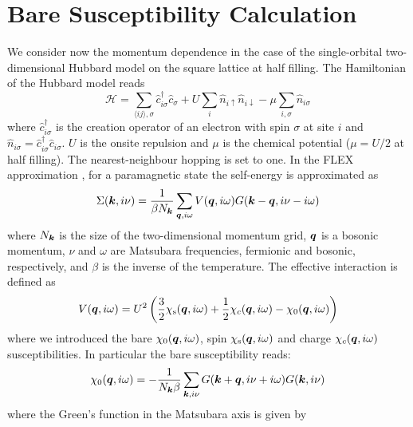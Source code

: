 \section{Bare Susceptibility Calculation}
\label{sec:bubbleCalc}

We consider now the momentum dependence in the case of the single-orbital two-dimensional Hubbard model on the square lattice at half filling. 
The Hamiltonian of the Hubbard model reads
\begin{equation}
    \mathcal{H} = \sum_{\langle ij \rangle, \sigma} \hat{c}^\dag_{i\sigma}\hat{c}_{\sigma} + U \sum_{i} \hat{n}_{i\uparrow}\hat{n}_{i\downarrow} - \mu\sum_{i,\sigma}\hat{n}_{i\sigma}
    \label{eq:HubbardHamiltonian}
\end{equation}
where $\hat{c}^\dag_{i\sigma}$ is the creation operator of an electron with spin $\sigma$ at site $i$ and $\hat{n}_{i\sigma}=\hat{c}^\dag_{i\sigma}\hat{c}_{i\sigma}$. $U$ is the onsite repulsion and $\mu$ is the chemical potential ($\mu=U/2$ at half filling). The nearest-neighbour hopping is set to one.
In the FLEX approximation \cite{Bickers1989}, for a paramagnetic state the self-energy is approximated as
\begin{equation}
    \Sigma(\boldsymbol{k}, i\nu) = \frac{1}{\beta N_{\boldsymbol{k}} } \sum_{\boldsymbol{q},i\omega}V(\boldsymbol{q}, i\omega) G(\boldsymbol{k} - \boldsymbol{q}, i\nu - i\omega)
\end{equation}
where $N_{\boldsymbol{k}}$ is the size of the two-dimensional momentum grid, $\boldsymbol{q}$ is a bosonic momentum, $\nu$ and $\omega$ are Matsubara frequencies, fermionic and bosonic, respectively, and $\beta$ is the inverse of the temperature. The effective interaction is defined as
\begin{equation}
    V(\boldsymbol{q}, i\omega) = U^2\left(\frac{3}{2} \chi_{\text{s}}(\boldsymbol{q}, i\omega) + \frac{1}{2} \chi_{c}(\boldsymbol{q}, i\omega) - \chi_{0}(\boldsymbol{q}, i\omega)\right)
\end{equation}
where we introduced the bare $\chi_{0}(\boldsymbol{q}, i\omega)$, spin $\chi_{\text{s}}(\boldsymbol{q}, i\omega)$ and charge $\chi_{c}(\boldsymbol{q}, i\omega)$ susceptibilities. In particular the bare susceptibility reads:
\begin{equation}
    \chi_{0}(\boldsymbol{q}, i\omega) = -\frac{1}{N_{\boldsymbol{k}}\beta} \sum_{\boldsymbol{k}, i\nu} G(\boldsymbol{k} + \boldsymbol{q},i\nu + i\omega)G(\boldsymbol{k}, i\nu)
    \label{eq:bareSusceptibility}
\end{equation}
where the Green's function in the Matsubara axis is given by 

